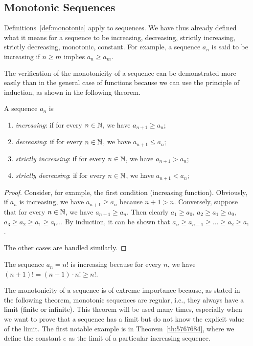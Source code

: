 \subsection{Monotonic Sequences}

Definitions~\ref{def:monotonia} apply to sequences. 
We have thus already defined what it means for a sequence to be 
increasing, decreasing, strictly increasing, strictly decreasing,
monotonic, constant. For example, a sequence $a_n$ is said to be 
increasing if $n\ge m$ implies $a_n \ge a_m$.

The verification of the monotonicity of a sequence can be demonstrated 
more easily than in the general case of functions because 
we can use the principle of induction, as shown in the following theorem.


\begin{theorem}
  \mymark{***}%
A sequence $a_n$ is
\begin{enumerate}
\item \emph{increasing}: if for every $n\in {\mathbb N}$, we have $a_{n+1} \ge a_n$;
\item \emph{decreasing}: if for every $n\in {\mathbb N}$, we have $a_{n+1} \le a_n$;
\item \emph{strictly increasing}: if for every $n\in {\mathbb N}$, we have $a_{n+1}>a_n$;
\item \emph{strictly decreasing}: if for every $n\in {\mathbb N}$, we have
$a_{n+1}<a_n$;
\end{enumerate}
\end{theorem}
%
\begin{proof}
  Consider, for example, the first condition (increasing function).
Obviously, if $a_n$ is increasing, we have $a_{n+1}\ge a_n$ because $n+1 > n$.
Conversely, suppose that for every $n\in {\mathbb N}$, we have $a_{n+1}\ge a_n$.  Then
clearly $a_1\ge a_0$, $a_2\ge a_1 \ge a_0$, $a_3 \ge a_2 \ge a_1 \ge a_0$...
By induction, it can be shown that  $a_n \ge a_{n-1} \ge \dots \ge a_2
\ge a_1$.

The other cases are handled similarly.
\end{proof}

\begin{example}
  The sequence $a_n = n!$ is increasing 
  because for every $n$, we have $(n+1)! = (n+1)\cdot n! \ge n!$.
\end{example}

The monotonicity of a sequence is of extreme importance because,
as stated in the following theorem, monotonic sequences are regular, 
i.e., they always have a limit (finite or infinite). 
This theorem will be used many times, especially when we want 
to prove that a sequence has a limit but do not know the explicit value 
of the limit. 
The first notable example is in Theorem~\ref{th:5767684}, where we define 
the constant $e$ as the limit of a particular increasing sequence.

